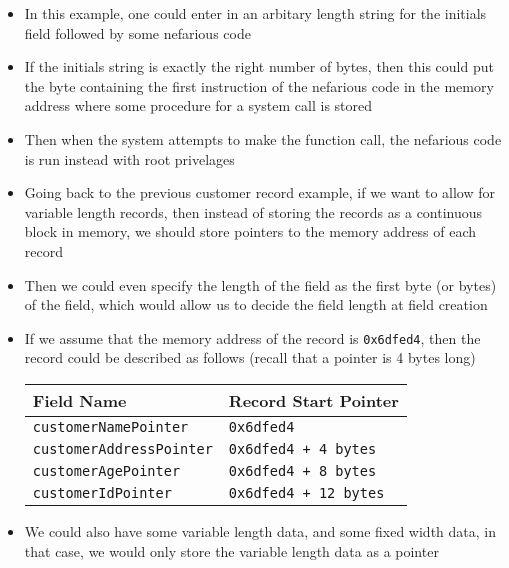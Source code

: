 \documentclass{article}
\newcommand {\code}{\texttt}
\begin{document}
\begin  {itemize}
			undefined behaviour to insert nefarious code in place of some system code
			that runs with elevated privelages
		\item In this example, one could enter in an arbitary length string for the
			initials field followed by some nefarious code
		\item If the initials string is exactly the right number of bytes, then this
			could put the byte containing the first instruction of the nefarious code
			in the memory address where some procedure for a system call is stored
		\item Then when the system attempts to make the function call, the nefarious code
			is run instead with root privelages
		\item Going back to the previous customer record example, if we want to allow
			for variable length records, then instead of storing the records as a 
			continuous block in memory, we should store pointers to the memory address
			of each record
		\item Then we could even specify the length of the field as the first byte 
			(or bytes) of the field, which would allow us to decide the field length
			at field creation
		\item If we assume that the memory address of the record is \code {0x6dfed4},
			then the record could be described as follows (recall that a pointer is
			4 bytes long)
			\begin {center}
				\label {ref:pointer_data}
				\begin {tabular}{ll}
					\hline
					\textbf {Field Name} 			&	\textbf {Record Start Pointer}	\\
					\hline
					\code {customerNamePointer}		&	\code {0x6dfed4}					\\
					\code {customerAddressPointer}	&	\code {0x6dfed4 + 4 bytes}		\\
					\code {customerAgePointer}		&	\code {0x6dfed4 + 8 bytes}		\\
					\code {customerIdPointer}		&	\code {0x6dfed4 + 12 bytes}		\\
					\hline	
				\end {tabular}
			\end {center}
		\item We could also have some variable length data, and some fixed width data, in
			that case, we would only store the variable length data as a pointer
	\end {itemize}
	
	
	
	
	
	
	
	
	
	
\end{document}
